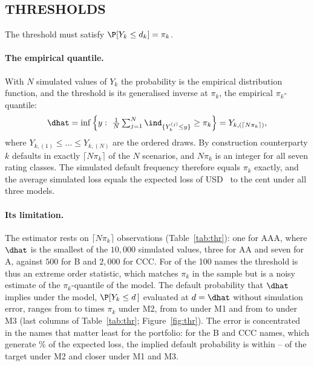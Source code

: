 \subsection{THRESHOLDS}
\label{subsec:thresholds}
The threshold must satisfy $\P[Y_k\le d_k]=\pi_k$.

\paragraph{The empirical quantile.}
With $N$ simulated values of $Y_k$ the probability is the empirical distribution function, and the threshold is its generalised inverse at $\pi_k$, the empirical $\pi_k$-quantile:
\begin{equation}
\label{eq:dhat}
\dhat=\inf\Big\{y:\ \tfrac1N\textstyle\sum_{j=1}^N\ind_{\{Y_k^{(j)}\le y\}}\ge\pi_k\Big\}=Y_{k,(\lceil N\pi_k\rceil)},
\end{equation}
where $Y_{k,(1)}\le\dots\le Y_{k,(N)}$ are the ordered draws. By construction counterparty $k$ defaults in exactly $\lceil N\pi_k\rceil$ of the $N$ scenarios, and $N\pi_k$ is an integer for all seven rating classes. The simulated default frequency therefore equals $\pi_k$ exactly, and the average simulated loss equals the expected loss of USD~ to the cent under all three models.

\paragraph{Its limitation.}
The estimator rests on $\lceil N\pi_k\rceil$ observations (Table~\ref{tab:thr}): one for AAA, where $\dhat$ is the smallest of the $10{,}000$ simulated values, three for AA and seven for A, against $500$ for B and $2{,}000$ for CCC. For  of the 100 names the threshold is thus an extreme order statistic, which matches $\pi_k$ in the sample but is a noisy estimate of the $\pi_k$-quantile of the model. The default probability that $\dhat$ implies under the model, $\P[Y_k\le d\,]$ evaluated at $d=\dhat$ without simulation error, ranges from  to  times $\pi_k$ under M2, from  to  under M1 and from  to  under M3 (last columns of Table~\ref{tab:thr}; Figure~\ref{fig:thr}). The error is concentrated in the names that matter least for the portfolio: for the B and CCC names, which generate \% of the expected loss, the implied default probability is within -- of the target under M2 and closer under M1 and M3.

